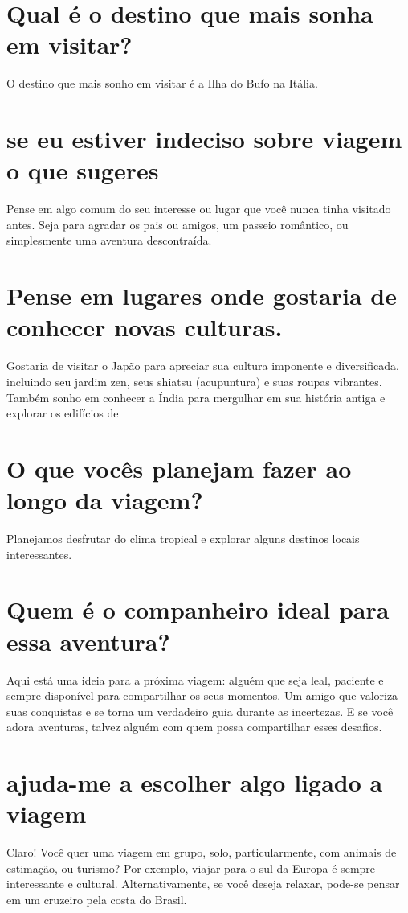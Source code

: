 \documentclass[11pt,a4paper]{article}
\begin{document}
\section{Qual é o destino que mais sonha em visitar?}
O destino que mais sonho em visitar é a Ilha do Bufo na Itália.

\section{se eu estiver indeciso sobre viagem o que sugeres}
Pense em algo comum do seu interesse ou lugar que você nunca tinha visitado antes. Seja para agradar os pais ou amigos, um passeio romântico, ou simplesmente uma aventura descontraída.

\section{Pense em lugares onde gostaria de conhecer novas culturas.}
Gostaria de visitar o Japão para apreciar sua cultura imponente e diversificada, incluindo seu jardim zen, seus shiatsu (acupuntura) e suas roupas vibrantes. Também sonho em conhecer a Índia para mergulhar em sua história antiga e explorar os edifícios de

\section{O que vocês planejam fazer ao longo da viagem?}
Planejamos desfrutar do clima tropical e explorar alguns destinos locais interessantes.

\section{Quem é o companheiro ideal para essa aventura?}
Aqui está uma ideia para a próxima viagem: alguém que seja leal, paciente e sempre disponível para compartilhar os seus momentos. Um amigo que valoriza suas conquistas e se torna um verdadeiro guia durante as incertezas. E se você adora aventuras, talvez alguém com quem possa compartilhar esses desafios.

\section{ajuda-me a escolher algo ligado a viagem}
Claro! Você quer uma viagem em grupo, solo, particularmente, com animais de estimação, ou turismo? Por exemplo, viajar para o sul da Europa é sempre interessante e cultural. Alternativamente, se você deseja relaxar, pode-se pensar em um cruzeiro pela costa do Brasil.
\end{document}
